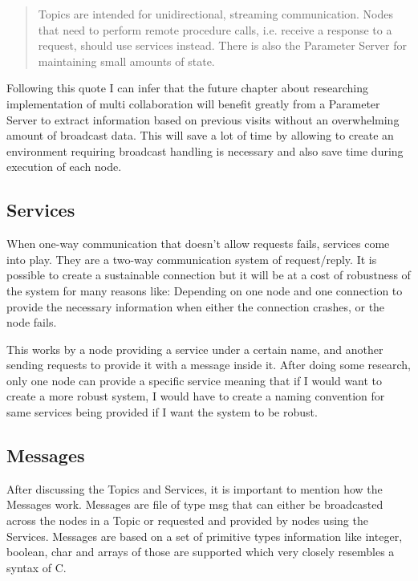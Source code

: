 \documentclass{report}
\begin{document}
      \begin{quote}
      Topics are intended for unidirectional, streaming communication. Nodes that need to perform remote procedure calls, i.e. receive a response to a request, should use services instead. There is also the Parameter Server for maintaining small amounts of state.  \end{quote}

      Following this quote I can infer that the future chapter about researching implementation of multi collaboration will benefit greatly from a Parameter Server to extract information based on previous visits without an overwhelming amount of broadcast data. This will save a lot of time by allowing to create an environment requiring broadcast handling is necessary and also save time during execution of each node.

      \subsection{Services}

      When one-way communication that doesn't allow requests fails, services come into play. They are a two-way communication system of request/reply. It is possible to create a sustainable connection but it will be at a cost of robustness of the system for many reasons like: Depending on one node and one connection to provide the necessary information when either the connection crashes, or the node fails.

      This works by a node providing a service under a certain name, and another sending requests to provide it with a message inside it. After doing some research, only one node can provide a specific service meaning that if I would want to create a more robust system, I would have to create a naming convention for same services being provided if I want the system to be robust.

      \subsection{Messages}

      After discussing the Topics and Services, it is important to mention how the Messages work. Messages are file of type msg that can either be broadcasted across the nodes in a Topic or requested and provided by nodes using the Services. Messages are based on a set of primitive types information like integer, boolean, char and arrays of those are supported which very closely resembles a syntax of C.
\end{document}
